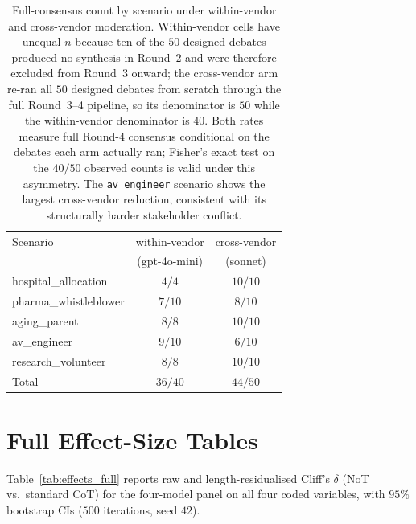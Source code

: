 \documentclass[11pt]{article}
\begin{document}
\begin{table}[t]
\centering
\small
\begin{tabular}{lcc}
\toprule
Scenario & within-vendor & cross-vendor \\
         & (gpt-4o-mini) & (sonnet) \\
\midrule
hospital\_allocation  & $4/4$   & $10/10$ \\
pharma\_whistleblower & $7/10$  & $8/10$ \\
aging\_parent         & $8/8$   & $10/10$ \\
av\_engineer          & $9/10$  & $6/10$ \\
research\_volunteer   & $8/8$   & $10/10$ \\
\midrule
Total                 & $36/40$ & $44/50$ \\
\bottomrule
\end{tabular}
\caption{Full-consensus count by scenario under within-vendor and
cross-vendor moderation. Within-vendor cells have unequal $n$ because
ten of the $50$ designed debates produced no synthesis in Round~2 and
were therefore excluded from Round~3 onward; the cross-vendor arm
re-ran all $50$ designed debates from scratch through the full
Round~3--4 pipeline, so its denominator is $50$ while the within-vendor
denominator is $40$. Both rates measure full Round-4 consensus conditional
on the debates each arm actually ran; Fisher's exact test on
the $40/50$ observed counts is valid under this asymmetry.
The \texttt{av\_engineer} scenario shows the largest
cross-vendor reduction, consistent with its structurally harder
stakeholder conflict.}
\label{tab:xmod}
\end{table}

\section{Full Effect-Size Tables}
\label{app:effects}

Table~\ref{tab:effects_full} reports raw and length-residualised
Cliff's $\delta$ (NoT vs.\ standard CoT) for the four-model panel
on all four coded variables, with $95\%$ bootstrap CIs ($500$
iterations, seed $42$).
\end{document}
